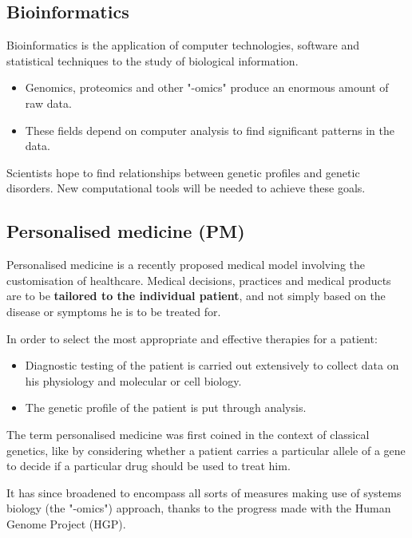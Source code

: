 \documentclass[11pt]{article}
\begin{document}
\subsection{Bioinformatics}
\label{sec:orgb09e8b9}
Bioinformatics is the application of computer technologies, software and statistical techniques to the study of biological information.
\begin{itemize}
\item Genomics, proteomics and other "-omics" produce an enormous amount of raw data.
\item These fields depend on computer analysis to find significant patterns in the data.
\end{itemize}

Scientists hope to find relationships between genetic profiles and genetic disorders. New computational tools will be needed to achieve these goals.
\subsection{Personalised medicine (PM)}
\label{sec:orge0138c7}
Personalised medicine is a recently proposed medical model involving the customisation of healthcare. Medical decisions, practices and medical products are to be \textbf{tailored to the individual patient}, and not simply based on the disease or symptoms he is to be treated for.


In order to select the most appropriate and effective therapies for a patient:
\begin{itemize}
\item Diagnostic testing of the patient is carried out extensively to collect data on his physiology and molecular or cell biology.
\item The genetic profile of the patient is put through analysis.
\end{itemize}

The term personalised medicine was first coined in the context of classical genetics, like by considering whether a patient carries a particular allele of a gene to decide if a particular drug should be used to treat him.

It has since broadened to encompass all sorts of measures making use of systems biology (the "-omics") approach, thanks to the progress made with the Human Genome Project (HGP).

\newpage
\end{document}
